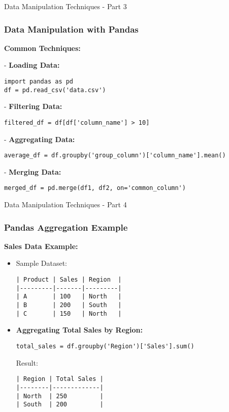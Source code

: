 \documentclass[aspectratio=169]{beamer}
\begin{document}
\begin{frame}[fragile]{Data Manipulation Techniques - Part 3}
    \frametitle{Data Manipulation with Pandas}
    \textbf{Common Techniques:}
    
    - \textbf{Loading Data:}
    \begin{lstlisting}
import pandas as pd
df = pd.read_csv('data.csv')
    \end{lstlisting}

    - \textbf{Filtering Data:}
    \begin{lstlisting}
filtered_df = df[df['column_name'] > 10]
    \end{lstlisting}

    - \textbf{Aggregating Data:}
    \begin{lstlisting}
average_df = df.groupby('group_column')['column_name'].mean()
    \end{lstlisting}
    
    - \textbf{Merging Data:}
    \begin{lstlisting}
merged_df = pd.merge(df1, df2, on='common_column')
    \end{lstlisting}
\end{frame}

\begin{frame}[fragile]{Data Manipulation Techniques - Part 4}
    \frametitle{Pandas Aggregation Example}
    \textbf{Sales Data Example:}
    \begin{itemize}
        \item Sample Dataset:
        \begin{verbatim}
| Product | Sales | Region  |
|---------|-------|---------|
| A       | 100   | North   |
| B       | 200   | South   |
| C       | 150   | North   |
        \end{verbatim}
        \item \textbf{Aggregating Total Sales by Region:}
        \begin{lstlisting}
total_sales = df.groupby('Region')['Sales'].sum()
        \end{lstlisting}
        Result:
        \begin{verbatim}
| Region | Total Sales |
|--------|-------------|
| North  | 250         |
| South  | 200         |
        \end{verbatim}
    \end{itemize}
\end{frame}
\end{document}

